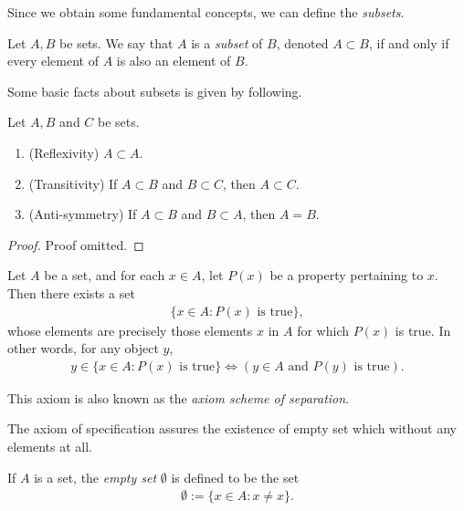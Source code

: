 Since we obtain some fundamental concepts, we can define the \emph{subsets}.

\begin{definition}[Subsets]
    Let $A, B$ be sets. We say that $A$ is a \emph{subset} of $B$, denoted $A \subset B$, if and only if every element of $A$ is also an element of $B$.
\end{definition}

Some basic facts about subsets is given by following.

\begin{proposition}
    Let $A, B$ and $C$ be sets.
    \begin{enumerate}
        \item (Reflexivity) $A \subset A$.
        \item (Transitivity) If $A \subset B$ and $B \subset C$, then $A \subset C$.
        \item (Anti-symmetry) If $A \subset B$ and $B \subset A$, then $A = B$.
    \end{enumerate}
\end{proposition}

\begin{proof}
    Proof omitted.
\end{proof}

\begin{axiom}
    Let $A$ be a set, and for each $x \in A$, let $P(x)$ be a property pertaining to $x$. Then there exists a set 
    \begin{align*}
        \{x \in A : P(x) \text{ is true}\},
    \end{align*}
    whose elements are precisely those elements $x$ in $A$ for which $P(x)$ is true. In other words, for any object $y$,
        \begin{align*}
            y \in \{x \in A : P(x) \text{ is true}\}
            \Longleftrightarrow 
            (y \in A \text{ and } P(y) \text{ is true}).
        \end{align*}
\end{axiom}

This axiom is also known as the \emph{axiom scheme of separation}.

The axiom of specification assures the existence of empty set which without any elements at all.

\begin{definition}
    If $A$ is a set, the \emph{empty set} $\emptyset$ is defined to be the set
    \begin{align*}
        \emptyset := \{x \in A : x \neq x\}.
    \end{align*}
\end{definition}


